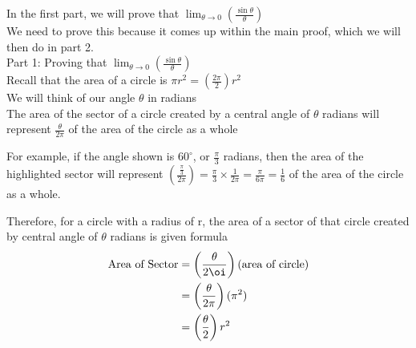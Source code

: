 \documentclass{article}
\begin{document}
In the first part, we will prove that  $\lim_{\theta \to 0}\left( \frac{\sin \theta }{\theta}\right)$\\

We need to prove this because it comes up within the main proof, which we will then do in part 2.\\

Part 1: Proving that $\lim_{\theta \to 0}\left( \frac{\sin \theta }{\theta}\right)$\\

Recall that the area of a circle is $\pi r^2=(\frac{2 \pi}{2})r^2$ \\
We will think of our angle $\theta$ in radians \\
The area of the sector of a circle created by a central angle of $\theta$ radians will represent $\frac{\theta}{2\pi}$ of the area of the circle as a whole \\

\begin{minipage}{0.5\textwidth}
For example, if the angle shown is $60^{\circ}$, or $\frac{\pi}{3}$ radians, then the area of the highlighted sector will represent $\left(\frac{\frac{\pi}{3}}{2\pi}\right)=\frac{\pi}{3}\times \frac{1}{2\pi}=\frac{\pi}{6\pi}=\frac{1}{6}$ of the area of the circle as a whole.
\end{minipage}
\hspace{1em}
\begin{minipage}{0.5\textwidth}
\end{minipage}

\hspace{1em}


Therefore, for a circle with a radius of r, the area of a sector of that circle created by central angle of $\theta$ radians is given formula \\

\begin{align*}
    \text{Area of Sector} &= \left(\frac{\theta}{2 \oi}\right )(\text{area of circle})\\
    &=\left(\frac{\theta}{2 \pi}\right)(\pi ^2)\\
    &=\left(\frac{\theta}{2}\right)r^2
\end{align*}
\end{document}
